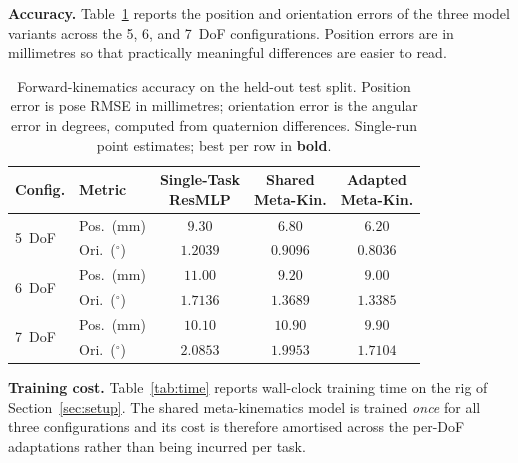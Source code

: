 \documentclass[conference]{IEEEtran}
\begin{document}
\textbf{Accuracy.}
Table~\ref{tab:results} reports the position and orientation errors of the three model variants across the 5, 6, and 7~DoF configurations. Position errors are in millimetres so that practically meaningful differences are easier to read.

\begin{table}[!t]
\renewcommand{\arraystretch}{1.15}
\caption{Forward-kinematics accuracy on the held-out test split. Position error is pose RMSE in millimetres; orientation error is the angular error in degrees, computed from quaternion differences. Single-run point estimates; best per row in \textbf{bold}.}
\label{tab:results}
\centering
\footnotesize
\begin{tabular}{llccc}
\toprule
Config. & Metric & \makecell{Single-Task\\ResMLP} & \makecell{Shared\\Meta-Kin.} & \makecell{Adapted\\Meta-Kin.} \\
\midrule
\multirow{2}{*}{5~DoF}
& Pos.\ (mm)        & $9.30$  & $6.80$  & $\mathbf{6.20}$ \\
& Ori.\ ($^\circ$)  & $1.2039$ & $0.9096$ & $\mathbf{0.8036}$ \\
\midrule
\multirow{2}{*}{6~DoF}
& Pos.\ (mm)        & $11.00$ & $9.20$  & $\mathbf{9.00}$ \\
& Ori.\ ($^\circ$)  & $1.7136$ & $1.3689$ & $\mathbf{1.3385}$ \\
\midrule
\multirow{2}{*}{7~DoF}
& Pos.\ (mm)        & $10.10$ & $10.90$ & $\mathbf{9.90}$ \\
& Ori.\ ($^\circ$)  & $2.0853$ & $1.9953$ & $\mathbf{1.7104}$ \\
\bottomrule
\end{tabular}
\end{table}

\textbf{Training cost.}
Table~\ref{tab:time} reports wall-clock training time on the rig of Section~\ref{sec:setup}. The shared meta-kinematics model is trained \emph{once} for all three configurations and its cost is therefore amortised across the per-DoF adaptations rather than being incurred per task.
\end{document}
